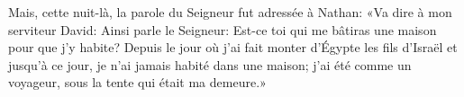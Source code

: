 Mais, cette nuit-là, la parole du Seigneur fut adressée à Nathan:
	«Va dire à mon serviteur David: Ainsi parle le Seigneur:
	Est-ce toi qui me bâtiras une maison pour que j’y habite?
Depuis le jour où j’ai fait monter d’Égypte les fils d’Israël et jusqu’à ce jour,
	je n’ai jamais habité dans une maison;
	j’ai été comme un voyageur, sous la tente qui était ma demeure.»

